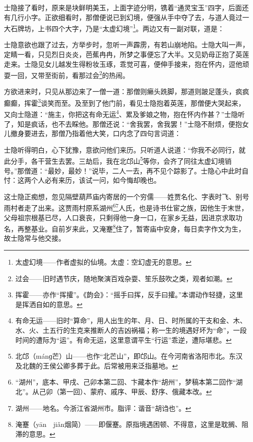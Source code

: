 \par 士隐接了看时，原来是块鲜明美玉，上面字迹分明，镌着“通灵宝玉”四字，后面还有几行小字。正欲细看时，那僧便说已到幻境，便强从手中夺了去，与道人竟过一大石牌坊，上书四个大字，乃是“太虚幻境”\footnote{太虚幻境——作者虚拟的仙境。太虚：空幻虚无的意思。}。两边又有一副对联，道是：
\par 士隐意欲也跟了过去，方举步时，忽听一声霹雳，有若山崩地陷。士隐大叫一声，定睛一看，只见烈日炎炎，芭蕉冉冉，所梦之事便忘了大半。又见奶母正抱了英莲走来。士隐见女儿越发生得粉妆玉琢，乖觉可喜，便伸手接来，抱在怀内，逗他顽耍一回，又带至街前，看那过会\footnote{过会——旧时遇节庆，随地聚演百戏杂耍、笙乐鼓吹之类，观者如潮。}的热闹。
\par 方欲进来时，只见从那边来了一僧一道：那僧则癞头跣脚，那道则跛足蓬头，疯疯癫癫，挥霍\footnote{挥霍——亦作“挥攉”。《韵会》：“摇手曰挥，反手曰攉。”本谓动作轻捷，这里是挥洒自如的意思。}谈笑而至。及至到了他门前，看见士隐抱着英莲，那僧便大哭起来，又向士隐道：“施主，你把这有命无运\footnote{有命无运——旧时“算命”，用人出生的年、月、日、时所属的干支和金、木、水、火、土五行的生克来推断人的吉凶祸福；称一生的境遇好坏为“命”，一段时间的遭际为“运”。有命无运，这里意谓平生“行运”乖逆，遭际堪悲。}、累及爹娘之物，抱在怀内作甚？”士隐听了，知是疯话，也不去睬他。那僧还说：“舍我罢，舍我罢！”士隐不耐烦，便抱女儿撤身要进去，那僧乃指着他大笑，口内念了四句言词道：
\par 士隐听得明白，心下犹豫，意欲问他们来历。只听道人说道：“你我不必同行，就此分手，各干营生去罢。三劫后，我在北邙山\footnote{北邙（mánɡ芒）山——也作“北芒山”，即邙山。在今河南省洛阳市北。东汉及北魏的王侯公卿多葬于此。后常被用来泛指墓地。}等你，会齐了同往太虚幻境销号。”那僧道：“最妙，最妙！”说毕，二人一去，再不见个踪影了。士隐心中此时自忖：这两个人必有来历，该试一问，如今悔却晚也。
\par 这士隐正痴想，忽见隔壁葫芦庙内寄居的一个穷儒——姓贾名化、字表时飞、别号雨村者走了出来。这贾雨村原系湖州\footnote{“湖州”，底本、甲戌、己卯本第二回、卞藏本作“胡州”，梦稿本第二回作“湖北”。从己卯（第一回）、蒙府、戚序、甲辰、舒序、俄藏本改。}\footnote{湖州——地名。今浙江省湖州市。脂评：谐音“胡诌也”。}人氏，也是诗书仕宦之族，因他生于末世，父母祖宗根基已尽，人口衰丧，只剩得他一身一口，在家乡无益，因进京求取功名，再整基业。自前岁来此，又淹蹇\footnote{淹蹇（yān　jiǎn烟简）——即偃蹇。原指境遇困顿、不得意，这里是耽搁、阻滞的意思。}住了，暂寄庙中安身，每日卖字作文为生，故士隐常与他交接。
